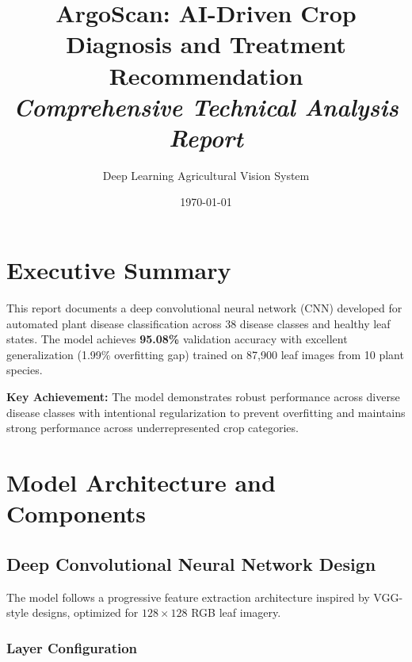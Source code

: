 \documentclass[11pt,a4paper]{article}
\title{\textbf{\color{primarynavy}ArgoScan: AI-Driven Crop Diagnosis and Treatment Recommendation} \\ \textit{\color{accentslate}Comprehensive Technical Analysis Report}}
\author{\color{charcoal}Deep Learning Agricultural Vision System}
\date{\today}
\begin{document}
\maketitle

\tableofcontents
\newpage

\section{Executive Summary}

This report documents a deep convolutional neural network (CNN) developed for automated plant disease classification across 38 disease classes and healthy leaf states. The model achieves \textbf{95.08\%} validation accuracy with excellent generalization (1.99\% overfitting gap) trained on 87,900 leaf images from 10 plant species.

\textbf{Key Achievement:} The model demonstrates robust performance across diverse disease classes with intentional regularization to prevent overfitting and maintains strong performance across underrepresented crop categories.

\newpage

\section{Model Architecture and Components}

\subsection{Deep Convolutional Neural Network Design}

The model follows a progressive feature extraction architecture inspired by VGG-style designs, optimized for $128 \times 128$ RGB leaf imagery.

\subsubsection{Layer Configuration}
\end{document}
